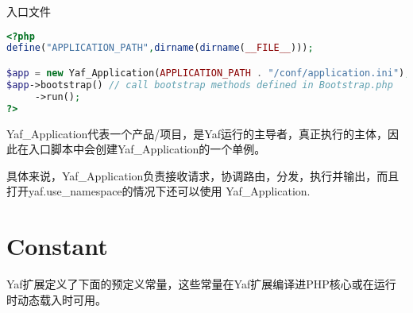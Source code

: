 \begin{example}
入口文件
\begin{lstlisting}[language=PHP]
<?php
define("APPLICATION_PATH",dirname(dirname(__FILE__)));

$app = new Yaf_Application(APPLICATION_PATH . "/conf/application.ini");
$app->bootstrap() // call bootstrap methods defined in Bootstrap.php
     ->run();
?>
\end{lstlisting}
\end{example}


Yaf\_Application代表一个产品/项目，是Yaf运行的主导者，真正执行的主体，因此在入口脚本中会创建Yaf\_Application的一个单例。

具体来说，Yaf\_Application负责接收请求，协调路由，分发，执行并输出，而且打开yaf.use\_namespace的情况下还可以使用 Yaf\_Application.


\section{Constant}

Yaf扩展定义了下面的预定义常量，这些常量在Yaf扩展编译进PHP核心或在运行时动态载入时可用。

